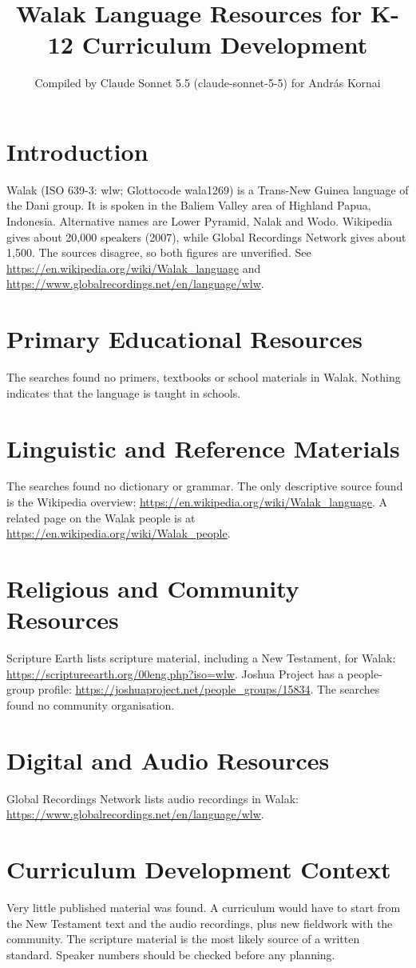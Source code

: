 \documentclass[12pt]{article}
\title{Walak Language Resources for K-12 Curriculum Development}
\author{Compiled by Claude Sonnet 5.5 (claude-sonnet-5-5) for Andr\'as Kornai}
\date{}
\begin{document}
\maketitle

\section{Introduction}
Walak (ISO 639-3: wlw; Glottocode wala1269) is a Trans-New Guinea language of the Dani group. It is spoken in the Baliem Valley area of Highland Papua, Indonesia. Alternative names are Lower Pyramid, Nalak and Wodo. Wikipedia gives about 20,000 speakers (2007), while Global Recordings Network gives about 1,500. The sources disagree, so both figures are unverified. See \url{https://en.wikipedia.org/wiki/Walak_language} and \url{https://www.globalrecordings.net/en/language/wlw}.

\section{Primary Educational Resources}
The searches found no primers, textbooks or school materials in Walak. Nothing indicates that the language is taught in schools.

\section{Linguistic and Reference Materials}
The searches found no dictionary or grammar. The only descriptive source found is the Wikipedia overview: \url{https://en.wikipedia.org/wiki/Walak_language}. A related page on the Walak people is at \url{https://en.wikipedia.org/wiki/Walak_people}.

\section{Religious and Community Resources}
Scripture Earth lists scripture material, including a New Testament, for Walak: \url{https://scriptureearth.org/00eng.php?iso=wlw}. Joshua Project has a people-group profile: \url{https://joshuaproject.net/people_groups/15834}. The searches found no community organisation.

\section{Digital and Audio Resources}
Global Recordings Network lists audio recordings in Walak: \url{https://www.globalrecordings.net/en/language/wlw}.

\section{Curriculum Development Context}
Very little published material was found. A curriculum would have to start from the New Testament text and the audio recordings, plus new fieldwork with the community. The scripture material is the most likely source of a written standard. Speaker numbers should be checked before any planning.
\end{document}
